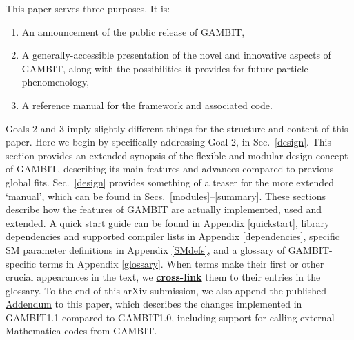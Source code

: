 \documentclass[pdftex,twocolumn,epjc3_preprint,runningheads]{svjour3}
\renewcommand{\_}{\discretionary{\underscore}{}{\underscore}}
\newcommand{\doublecross}[2]{\hyperref[#2]{\textbf{#1}}}
\newcommand{\gambit}{\textsf{GAMBIT}\xspace}
\newcommand{\GB}{\gambit}
\newcommand\Mathematica{\textsf{Mathematica}\xspace}
\begin{document}
This paper serves three purposes.  It is:
\begin{enumerate}
\item An announcement of the public release of \GB,
\item A generally-accessible presentation of the novel and innovative aspects of \GB, along with the possibilities it provides for future particle phenomenology,
\item A reference manual for the framework and associated code.
\end{enumerate}
Goals 2 and 3 imply slightly different things for the structure and content of this paper.  Here we begin by specifically addressing Goal 2, in Sec.\ \ref{design}. This section provides an extended synopsis of the flexible and modular design concept of \GB, describing its main features and advances compared to previous global fits.  Sec.\ \ref{design} provides something of a teaser for the more extended `manual', which can be found in Secs.~\ref{modules}--\ref{summary}.  These sections describe how the features of \GB are actually implemented, used and extended.  A quick start guide can be found in Appendix \ref{quickstart}, library dependencies and supported compiler lists in Appendix \ref{dependencies}, specific SM parameter definitions in Appendix \ref{SMdefs}, and a glossary of \GB-specific terms in Appendix \ref{glossary}.  When terms make their first or other crucial appearances in the text, we \doublecross{cross-link}{glossary} them to their entries in the glossary.  To the end of this arXiv submission, we also append the published \hyperlink{addendum}{Addendum} to this paper, which describes the changes implemented in \GB \textsf{1.1} compared to \GB \textsf{1.0}, including support for calling external \Mathematica codes from \GB.
\end{document}
